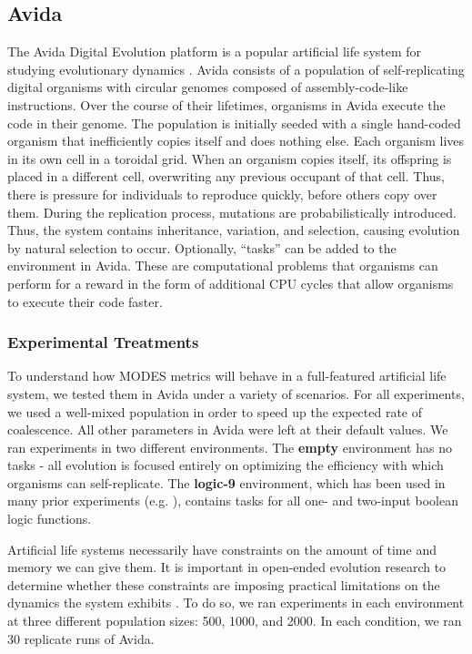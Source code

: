 \documentclass[letterpaper]{article}
\begin{document}
\subsection{Avida}

The Avida Digital Evolution platform is a popular artificial life system for studying evolutionary dynamics \citep{ofria_avida:_2004}. Avida consists of a population of self-replicating digital organisms with circular genomes composed of assembly-code-like instructions. Over the course of their lifetimes, organisms in Avida execute the code in their genome. The population is initially seeded with a single hand-coded organism that inefficiently copies itself and does nothing else. Each organism lives in its own cell in a toroidal grid. When an organism copies itself, its offspring is placed in a different cell, overwriting any previous occupant of that cell. Thus, there is pressure for individuals to reproduce quickly, before others copy over them. During the replication process, mutations are probabilistically introduced. Thus, the system contains inheritance, variation, and selection, causing evolution by natural selection to occur. Optionally, ``tasks'' can be added to the environment in Avida. These are computational problems that organisms can perform for a reward in the form of additional CPU cycles that allow organisms to execute their code faster.

\subsubsection{Experimental Treatments}
To understand how MODES metrics will behave in a full-featured artificial life system, we tested them in Avida under a variety of scenarios. For all experiments, we used a well-mixed population in order to speed up the expected rate of coalescence. All other parameters in Avida were left at their default values. We ran experiments in two different environments. The \textbf{empty} environment has no tasks - all evolution is focused entirely on optimizing the efficiency with which organisms can self-replicate. The \textbf{logic-9} environment, which has been used in many prior experiments (e.g. \citep{lenski_evolutionary_2003}), contains tasks for all one- and two-input boolean logic functions.

Artificial life systems necessarily have constraints on the amount of time and memory we can give them. It is important in open-ended evolution research to determine whether these constraints are imposing practical limitations on the dynamics the system exhibits \citep{zaman_investigating_2018}. To do so, we ran experiments in each environment at three different population sizes: 500, 1000, and 2000. In each condition, we ran 30 replicate runs of Avida.
\end{document}
